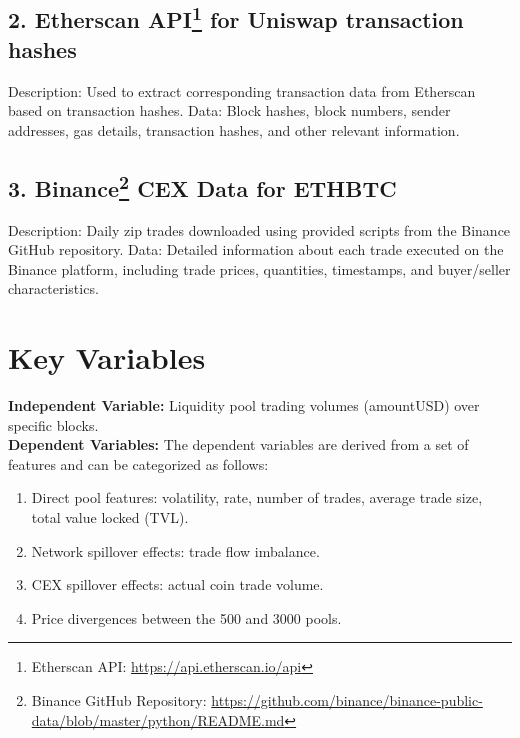 \documentclass{article}
\begin{document}
{\subsection*{2. Etherscan API\footnote{Etherscan API: \url{https://api.etherscan.io/api}} for Uniswap transaction hashes}
Description: Used to extract corresponding transaction data from Etherscan based on transaction hashes.
Data: Block hashes, block numbers, sender addresses, gas details, transaction hashes, and other relevant information.

\subsection*{3. Binance\footnote{Binance GitHub Repository: \url{https://github.com/binance/binance-public-data/blob/master/python/README.md}} CEX Data for ETHBTC}
\begin{minipage}[t]{0.78\textwidth}
Description: Daily zip trades downloaded using provided scripts from the Binance GitHub repository.
Data: Detailed information about each trade executed on the Binance platform, including trade prices, quantities, timestamps, and buyer/seller characteristics.
\end{minipage}

\section*{Key Variables}
\textbf{Independent Variable:} Liquidity pool trading volumes (amountUSD) over specific blocks.\\

\textbf{Dependent Variables:}
The dependent variables are derived from a set of features and can be categorized as follows:
\begin{enumerate}[label=\arabic*. ,itemsep=0pt, topsep=0pt]
\item Direct pool features: volatility, rate, number of trades, average trade size, total value locked (TVL).
\item Network spillover effects: trade flow imbalance.
\item CEX spillover effects: actual coin trade volume.
\item Price divergences between the 500 and 3000 pools.
\end{enumerate}

}
\end{document}
